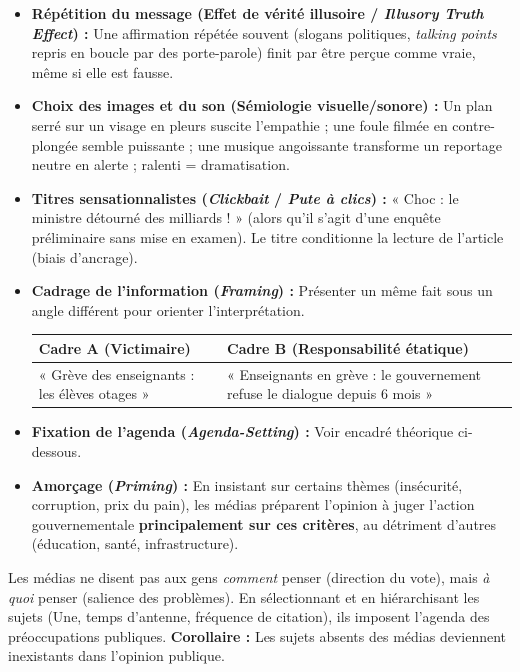 \documentclass[11pt]{article}
\begin{document}
\begin{propriete}
\begin{itemize}
    \item \textbf{Répétition du message (Effet de vérité illusoire / \emph{Illusory Truth Effect}) :} Une affirmation répétée souvent (slogans politiques, \emph{talking points} repris en boucle par des porte-parole) finit par être perçue comme vraie, même si elle est fausse.
    \item \textbf{Choix des images et du son (Sémiologie visuelle/sonore) :} Un plan serré sur un visage en pleurs suscite l'empathie ; une foule filmée en contre-plongée semble puissante ; une musique angoissante transforme un reportage neutre en alerte ; ralenti = dramatisation.
    \item \textbf{Titres sensationnalistes (\emph{Clickbait} / \emph{Pute à clics}) :} « Choc : le ministre détourné des milliards ! » (alors qu'il s'agit d'une enquête préliminaire sans mise en examen). Le titre conditionne la lecture de l'article (biais d'ancrage).
    \item \textbf{Cadrage de l'information (\emph{Framing}) :} Présenter un même fait sous un angle différent pour orienter l'interprétation.
    \begin{center}
    \begin{tabularx}{\linewidth}{|X|X|}\hline
    \rowcolor{poporangeL}
    \textbf{Cadre A (Victimaire)} & \textbf{Cadre B (Responsabilité étatique)} \\ \hline
    « Grève des enseignants : les élèves otages » & « Enseignants en grève : le gouvernement refuse le dialogue depuis 6 mois » \\ \hline
    \end{tabularx}
    \end{center}
    \item \textbf{Fixation de l'agenda (\emph{Agenda-Setting}) :} Voir encadré théorique ci-dessous.
    \item \textbf{Amorçage (\emph{Priming}) :} En insistant sur certains thèmes (insécurité, corruption, prix du pain), les médias préparent l'opinion à juger l'action gouvernementale \textbf{principalement sur ces critères}, au détriment d'autres (éducation, santé, infrastructure).
\end{itemize}
\end{propriete}

\begin{definition}
Les médias ne disent pas aux gens \emph{comment} penser (direction du vote), mais \emph{à quoi} penser (salience des problèmes). En sélectionnant et en hiérarchisant les sujets (Une, temps d'antenne, fréquence de citation), ils imposent l'agenda des préoccupations publiques. \textbf{Corollaire :} Les sujets absents des médias deviennent inexistants dans l'opinion publique.
\end{definition}
\end{document}
